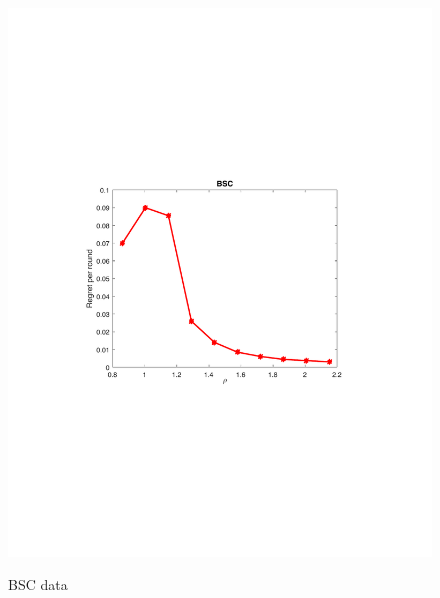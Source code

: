 \begin{figure}[!bt]
\begin{minipage}{4cm}
		\includegraphics[scale=0.3]{../Simulations/Figures/BSC_WD2}
		\label{fig:BSC_WD}
		\vspace{-.5cm}
		\caption{BSC data}
	\end{minipage}
	\begin{minipage}{4cm}
		\centering

\end{minipage}
\end{figure}
